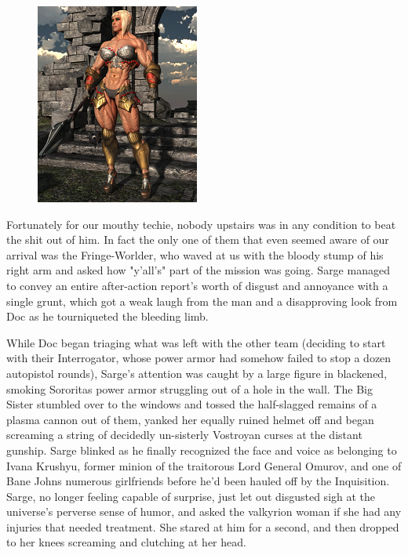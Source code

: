 \begin{figure}
	\begin{center}
		\includegraphics[width=\figwidth]{pics/19/2.png}
	\end{center}
\end{figure}
Fortunately for our mouthy techie, nobody upstairs was in any condition to beat the shit out of him. 
In fact the only one of them that even seemed aware of our arrival was the Fringe-Worlder, who waved at us with the bloody stump of his right arm and asked how "y'all's" part of the mission was going. 
Sarge managed to convey an entire after-action report's worth of disgust and annoyance with a single grunt, which got a weak laugh from the man and a disapproving look from Doc as he tourniqueted the bleeding limb.

While Doc began triaging what was left with the other team (deciding to start with their Interrogator, whose power armor had somehow failed to stop a dozen autopistol rounds), Sarge's attention was caught by a large figure in blackened, smoking Sororitas power armor struggling out of a hole in the wall. 
The Big Sister stumbled over to the windows and tossed the half-slagged remains of a plasma cannon out of them, yanked her equally ruined helmet off and began screaming a string of decidedly un-sisterly Vostroyan curses at the distant gunship. 
Sarge blinked as he finally recognized the face and voice as belonging to Ivana Krushyu, former minion of the traitorous Lord General Omurov, and one of Bane Johns numerous girlfriends before he'd been hauled off by the Inquisition. 
Sarge, no longer feeling capable of surprise, just let out disgusted sigh at the universe's perverse sense of humor, and asked the valkyrion woman if she had any injuries that needed treatment. 
She stared at him for a second, and then dropped to her knees screaming and clutching at her head.

